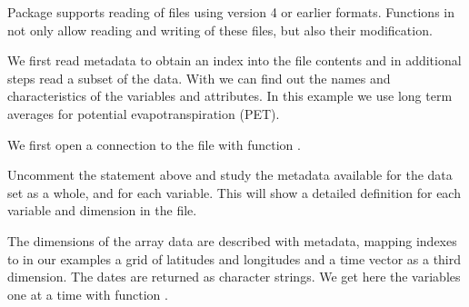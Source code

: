 \documentclass[krantz2]{krantz}\usepackage{knitr}%
\begin{document}
Package  supports reading of files using  version 4 or earlier formats. Functions in  not only allow reading and writing of these files, but also their modification.

We first read metadata to obtain an index into the file contents and in additional steps read a subset of the data. With  we can find out the names and characteristics of the variables and attributes. In this example we use long term averages for potential evapotranspiration (PET).

We first open a connection to the file with function .

\begin{knitrout}\footnotesize
{}\color{fgcolor}\begin{kframe}
\begin{alltt}
 \hlkwb{<-} \hlstd{(}\hlstd{)}
\end{alltt}
\end{kframe}
\end{knitrout}

\begin{playground}
Uncomment the  statement above and study the metadata available for the data set as a whole, and for each variable. This will show a detailed definition for each variable and dimension in the file.
\end{playground}
The dimensions of the array data are described with metadata, mapping indexes to in our examples a grid of latitudes and longitudes and a time vector as a third dimension. The dates are returned as character strings. We get here the variables one at a time with function .
\end{document}
